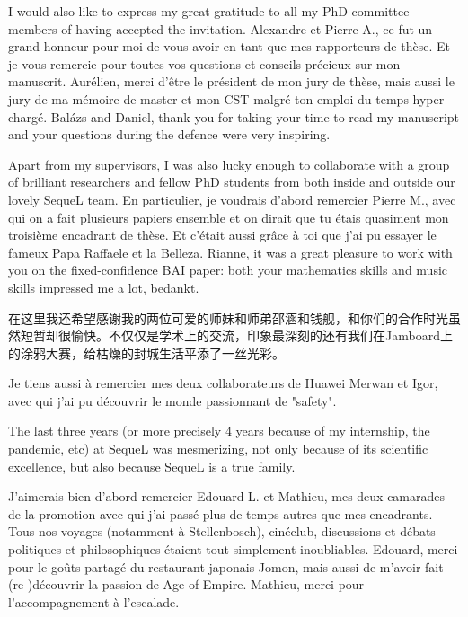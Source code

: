 I would also like to express my great gratitude to all my PhD committee members of having accepted the invitation. Alexandre et Pierre A., ce fut un grand honneur pour moi de vous avoir en tant que mes rapporteurs de th\`ese. Et je vous remercie pour toutes vos questions et conseils pr\'ecieux sur mon manuscrit. Aur\'elien, merci d'\^etre le pr\'esident de mon jury de th\`ese, mais aussi le jury de ma m\'emoire de master et mon CST malgr\'e ton emploi du temps hyper charg\'e. Bal\'azs and Daniel, thank you for taking your time to read my manuscript and your questions during the defence were very inspiring.

Apart from my supervisors, I was also lucky enough to collaborate with a group of brilliant researchers and fellow PhD students from both inside and outside our lovely SequeL team. En particulier, je voudrais d'abord remercier Pierre M., avec qui on a fait plusieurs papiers ensemble et on dirait que tu \'etais quasiment mon troisi\`eme encadrant de th\`ese. Et c'\'etait aussi gr\^ace \`a toi que j'ai pu essayer le fameux Papa Raffaele et la Belleza. Rianne, it was a great pleasure to work with you on the fixed-confidence BAI paper: both your mathematics skills and music skills impressed me a lot, bedankt. \begin{CJK*}{UTF8}{gbsn}在这里我还希望感谢我的两位可爱的师妹和师弟邵涵和钱舰，和你们的合作时光虽然短暂却很愉快。不仅仅是学术上的交流，印象最深刻的还有我们在Jamboard上的涂鸦大赛，给枯燥的封城生活平添了一丝光彩。\end{CJK*} Je tiens aussi \`a remercier mes deux collaborateurs de Huawei Merwan et Igor, avec qui j'ai pu d\'ecouvrir le monde passionnant de "safety".

The last three years (or more precisely 4 years because of my internship, the pandemic, etc) at SequeL was mesmerizing, not only because of its scientific excellence, but also because SequeL is a true family.

J'aimerais bien d'abord remercier Edouard L. et Mathieu, mes deux camarades de la promotion avec qui j'ai pass\'e plus de temps autres que mes encadrants. Tous nos voyages (notamment \`a Stellenbosch), cin\'eclub, discussions et d\'ebats politiques et philosophiques \'etaient tout simplement inoubliables. Edouard, merci pour le go\^uts partag\'e du restaurant japonais Jomon, mais aussi de m'avoir fait (re-)d\'ecouvrir la passion de Age of Empire. Mathieu, merci pour l'accompagnement \`a l'escalade. 

